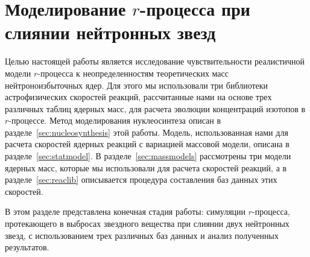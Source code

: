 \section{Моделирование $r$-процесса при слиянии нейтронных звезд} \label{skynet}
Целью настоящей работы является исследование чувствительности реалистичной модели $r$-процесса к неопределенностям теоретических масс нейтроноизбыточных ядер. Для этого мы использовали три библиотеки астрофизических скоростей реакций, рассчитанные нами на основе трех различных таблиц ядерных масс, для расчета эволюции концентраций изотопов в $r$-процессе. Метод моделирования нуклеосинтеза описан в разделе~\ref{sec:nucleosynthesis} этой работы. Модель, использованная нами для расчета скоростей ядерных реакций с вариацией массовой модели, описана в разделе~\ref{sec:statmodel}. В разделе~\ref{sec:massmodels} рассмотрены три модели ядерных масс, которые мы использовали для расчета скоростей реакций, а в разделе~\ref{sec:reaclib} описывается процедура составления баз данных этих скоростей. 

В этом разделе представлена конечная стадия работы: симуляции $r$-процесса, протекающего в выбросах звездного вещества при слиянии двух нейтронных звезд, с использованием трех различных баз данных и анализ полученных результатов. 



